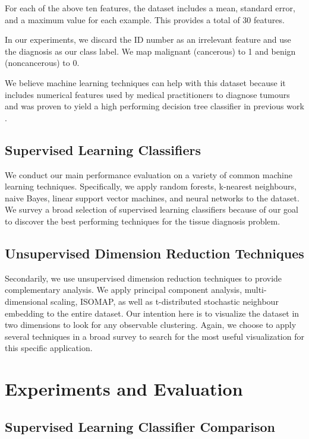 \documentclass{article}
\begin{document}
For each of the above ten features, the dataset includes a mean, standard error, and a maximum value for each example. This provides a total of 30 features.

In our experiments, we discard the ID number as an irrelevant feature and use the diagnosis as our class label. We map malignant (cancerous) to 1 and benign (noncancerous) to 0.

We believe machine learning techniques can help with this dataset because it includes numerical features used by medical practitioners to diagnose tumours and was proven to yield a high performing decision tree classifier in previous work \cite{tumour:1993}.

\subsection{Supervised Learning Classifiers}

We conduct our main performance evaluation on a variety of common machine learning techniques. Specifically, we apply random forests, k-nearest neighbours, naive Bayes, linear support vector machines, and neural networks to the dataset. We survey a broad selection of supervised learning classifiers because of our goal to discover the best performing techniques for the tissue diagnosis problem.

\subsection{Unsupervised Dimension Reduction Techniques}

Secondarily, we use unsupervised dimension reduction techniques to provide complementary analysis. We apply principal component analysis, multi-dimensional scaling, ISOMAP, as well as t-distributed stochastic neighbour embedding to the entire dataset. Our intention here is to visualize the dataset in two dimensions to look for any observable clustering. Again, we choose to apply several techniques in a broad survey to search for the most useful visualization for this specific application.

\section{Experiments and Evaluation}

\subsection{Supervised Learning Classifier Comparison}
\end{document}
